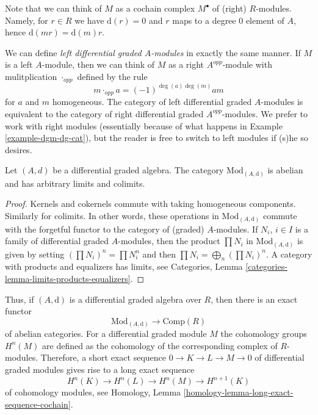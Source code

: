 \noindent
Note that we can think of $M$ as a cochain complex $M^\bullet$
of (right) $R$-modules. Namely, for $r \in R$ we have $\text{d}(r) = 0$
and $r$ maps to a degree $0$ element of $A$, hence
$\text{d}(mr) = \text{d}(m)r$.

\medskip\noindent
We can define {\it left differential graded $A$-modules} in exactly the same
manner. If $M$ is a left $A$-module, then we can think of $M$ as a
right $A^{opp}$-module with mulitplication $\cdot_{opp}$ defined by
the rule
$$
m \cdot_{opp} a = (-1)^{\deg(a)\deg(m)} a m
$$
for $a$ and $m$ homogeneous. The category of left differential graded
$A$-modules is equivalent to the category of right differential
graded $A^{opp}$-modules. We prefer to work with right modules
(essentially because of what happens in Example \ref{example-dgm-dg-cat}), but
the reader is free to switch to left modules if (s)he so desires.

\begin{lemma}
\label{lemma-dgm-abelian}
Let $(A, d)$ be a differential graded algebra. The category
$\text{Mod}_{(A, \text{d})}$ is abelian and has arbitrary limits and colimits.
\end{lemma}

\begin{proof}
Kernels and cokernels commute with taking homogeneous components. Similarly
for colimits. In other words, these operations in $\text{Mod}_{(A, \text{d})}$
commute with the forgetful functor to the category of (graded) $A$-modules.
If $N_i$, $i \in I$ is a family of differential graded $A$-modules,
then the product $\prod N_i$ in $\text{Mod}_{(A, \text{d})}$ is
given by setting $(\prod N_i)^n = \prod N_i^n$ and then
$\prod N_i = \bigoplus_n (\prod N_i)^n$. A category with products
and equalizers has limits, see
Categories, Lemma \ref{categories-lemma-limits-products-equalizers}.
\end{proof}

\noindent
Thus, if $(A, \text{d})$ is a differential graded
algebra over $R$, then there is an exact functor
$$
\text{Mod}_{(A, \text{d})} \longrightarrow \text{Comp}(R)
$$
of abelian categories. For a differential graded module $M$ the
cohomology groups $H^n(M)$ are defined as the cohomology of the
corresponding complex of $R$-modules. Therefore, a short exact
sequence $0 \to K \to L \to M \to 0$ of differential graded modules
gives rise to a long exact sequence
\begin{equation}
\label{equation-les}
H^n(K) \to H^n(L) \to H^n(M) \to H^{n + 1}(K)
\end{equation}
of cohomology modules, see
Homology, Lemma \ref{homology-lemma-long-exact-sequence-cochain}.

